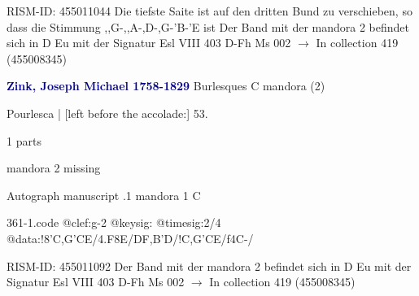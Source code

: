 \documentclass[twocolumn]{book}
\begin{document}
\newline RISM-ID: 455011044
\newline Die tiefste Saite ist auf den dritten Bund zu verschieben, so dass die Stimmung ,,G-,,A-,D-,G-'B-'E ist
\newline Der Band mit der mandora 2 befindet sich in D Eu mit der Signatur Esl VIII 403
\newline D-Fh  Ms 002
\newline $\rightarrow$ In collection 419 (455008345)

\newline \par \vspace{7pt} \textcolor{darkblue}{\textbf{Zink, Joseph Michael  1758-1829}}
\newline Burlesques  C  
\newline mandora (2)
\newline \begin{itshape}[f.28r, at left:] Pourlesca | [left before the accolade:] 53.\end{itshape} 
\newline \textcolor{darkblue}{}  1 parts  
\newline \begin{small} mandora 2 missing\end{small} 
\newline Autograph manuscript
.1  mandora 1  C  
\begin{filecontents*}{361-1.code}
@clef:g-2
@keysig:
@timesig:2/4
@data:!8'C,G'CE/4.F8E/DF{,B'D}/!C,G'CE/f4C-/
\end{filecontents*}
\newline
%

\newline RISM-ID: 455011092
\newline Der Band mit der mandora 2 befindet sich in D Eu mit der Signatur Esl VIII 403
\newline D-Fh  Ms 002
\newline $\rightarrow$ In collection 419 (455008345)
\end{document}
